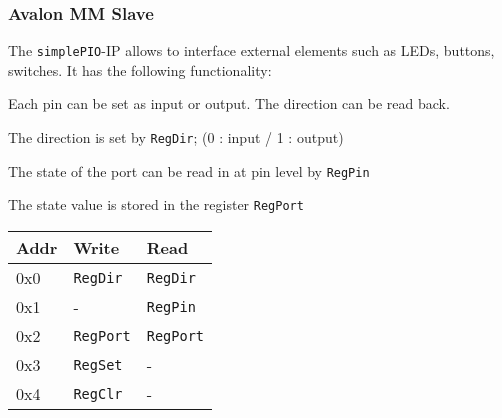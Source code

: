 		\subsubsection{Avalon MM Slave }
			\begin{multicols}{2}
					The \texttt{simplePIO}-IP allows to interface external elements such as LEDs, buttons, switches. It has the following functionality:
					\begin{compactitem}
						\item Each pin can be set as input or output. The direction can be read back.
						\item The direction is set by \texttt{RegDir}; (0 : input / 1 : output)
						\item The state of the port can be read in at pin level by \texttt{RegPin}
						\item The state value is stored in the register \texttt{RegPort}
					\end{compactitem}
				\begin{tabular}{|p{0.1\textwidth}|p{}|p{}|}
					\hline
					\textbf{Addr} & \textbf{Write} & \textbf{Read} \\
					\hline
					0x0 & \texttt{RegDir} & \texttt{RegDir} \\ \hline
					0x1 & - & \texttt{RegPin} \\ \hline
					0x2 & \texttt{RegPort} & \texttt{RegPort} \\ \hline
					0x3 & \texttt{RegSet} & - \\ \hline
					0x4 & \texttt{RegClr} & - \\ \hline
				\end{tabular}
			\end{multicols}
			\begin{multicols}{2}		
				
			\end{multicols}			
			
